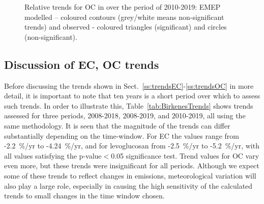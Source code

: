 \begin{figure}  %
\caption{Relative trends for OC in \pmfine over the period of 2010-2019: EMEP modelled -- coloured contours (grey/white means non-significant trends) and observed - coloured triangles (significant) and circles (non-significant).}
\label{fig:OCtrends}
\end{figure}

\subsection{Discussion of EC, OC trends}
\label{ss:DiscECOC}

Before discussing the trends shown in Sect.~\ref{ss:trendsEC}-\ref{ss:trendsOC} in  more detail, it is important to note that ten years is a short period over which to assess such trends. In order to illustrate this, Table~\ref{tab:BirkenesTrends} shows trends assessed for three periods, 2008-2018, 2008-2019, and 2010-2019, all using the same methodology. It is seen that the magnitude of the trends can differ substantially depending on the time-window. For EC the values range from -2.2~\%/yr to \mbox{-4.24~\%/yr}, and for levoglucosan from -2.5~\%/yr to -5.2~\%/yr, with all values satisfying the p-value$<$0.05 significance test. Trend values for OC vary even more, but these trends were insignificant for all periods. Although we expect some of these trends to reflect changes in emissions, meteorological variation will also play a large role, especially in causing the high sensitivity of the calculated trends to small changes in the time window chosen.


